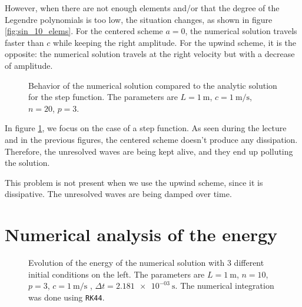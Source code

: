 \documentclass[11 pt]{article}
\begin{document}
However, when there are not enough elements and/or that the degree of the Legendre polynomials is too low, the situation changes, as shown in figure \ref{fig:sin_10_elems}. For the centered scheme $a=0$, the numerical solution travels faster than $c$ while keeping the right amplitude. For the upwind scheme, it is the opposite: the numerical solution travels at the right velocity but with a decrease of amplitude.

\begin{figure}[H]
    \centering
    
    \caption{Behavior of the numerical solution compared to the analytic solution for the step function. The parameters are $L=\qty[per-mode = symbol]{1}{\m}$, $c=\qty[per-mode = symbol]{1}{\m\per\s}$, $n=20$, $p=3$.}
    \label{fig:step_function}
\end{figure}


In figure \ref{fig:step_function}, we focus on the case of a step function. As seen during the lecture and in the previous figures, the centered scheme doesn't produce any dissipation. Therefore, the unresolved waves are being kept alive, and they end up polluting the solution.

This problem is not present when we use the upwind scheme, since it is dissipative. The unresolved waves are being damped over time.





\section{Numerical analysis of the energy}
\begin{figure}[H]
    \centering
    
    \caption{Evolution of the energy of the numerical solution with 3 different initial conditions on the left. The parameters are $L=\qty[per-mode = symbol]{1}{\m}$, $n=10$, $p=3$, $c=\qty[per-mode = symbol]{1}{\m\per\s}$ , $\Delta t=\qty[per-mode = symbol]{2.181e-03}{\s}$. The numerical integration was done using \texttt{RK44}.}
    \label{fig:energy}
\end{figure}
\end{document}
